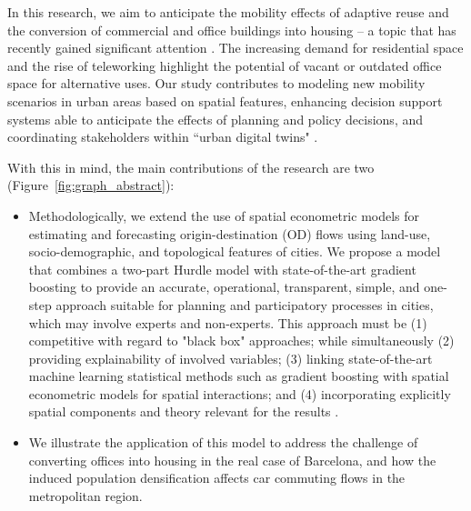 In this research, we aim to anticipate the mobility effects of adaptive reuse \citep{Remy2014, Pratiwi2023} and the conversion of commercial and office buildings into housing -- a topic that has recently gained significant attention \citep{2023The2023, AjuntamentdeBarcelona2024, Frei2023a, Schneebeli2021a, Rohwetter, Tagesschau, Bloomberg2021a, Meyer2024a}. 
The increasing demand for residential space and the rise of teleworking highlight the potential of vacant or outdated office space for alternative uses. Our study contributes to modeling new mobility scenarios in urban areas based on spatial features, enhancing decision support systems \citep{Geertman2012PlanningScience} able to anticipate the effects of planning and policy decisions, and coordinating stakeholders within ``urban digital twins" \citep{Batty2018, Bettencourt2024RecentTwins}. 

With this in mind, the main contributions of the research are two (Figure~\ref{fig:graph_abstract}):
\begin{itemize}
    \item Methodologically, we extend the use of spatial econometric models for estimating and forecasting origin-destination (OD) flows using land-use, socio-demographic, and topological features of cities. We propose a model that combines a two-part Hurdle model with state-of-the-art gradient boosting to provide an accurate, operational, transparent, simple, and one-step approach suitable for planning and participatory processes in cities, which may involve experts and non-experts. This approach must be (1) competitive with regard to "black box" approaches; while simultaneously (2) providing explainability of involved variables; (3) linking state-of-the-art machine learning statistical methods such as gradient boosting with spatial econometric models for spatial interactions; and (4) incorporating explicitly spatial components and theory relevant for the results \citep{Credit2022SpatialAngeles,Singleton2021GeographicScience}.
    \item We illustrate the application of this model to address the challenge of converting offices into housing in the real case of Barcelona, and how the induced population densification affects car commuting flows in the metropolitan region.
\end{itemize}

